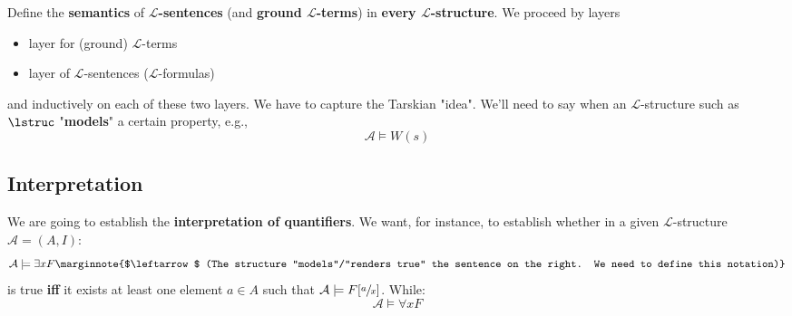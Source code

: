 \noindent
Define the \textbf{semantics} of \textbf{$\mathcal{L}$-sentences} (and \textbf{ground $\mathcal{L}$-terms}) in \textbf{every $\mathcal{L}$-structure}. We proceed by layers
\begin{itemize}
	\item layer for (ground) $\mathcal{L}$-terms
	\item layer of $\mathcal{L}$-sentences ($\mathcal{L}$-formulas)
\end{itemize}
and inductively on each of these two layers. We have to capture the Tarskian "idea". We'll need to say when an $\mathcal{L}$-structure such as $\lstruc$ "\textbf{models}" a certain property, e.g.,
$$ \mathcal{A} \models W(s)$$






\subsection{Interpretation}

We are going to establish the \textbf{interpretation of quantifiers}. We want, for instance, to establish whether in a given $\mathcal{L}$-structure $\mathcal{A} = (A,I)$:
$$ \mathcal{A} \models \exists x F \marginnote{$\leftarrow$ (The structure "models"/"renders true" the sentence on the right. We need to define this notation)}$$
\noindent
is true \textbf{iff} it exists at least one element $a \in A$ such that $\mathcal{A} \models F[\sfrac{a}{x}]$. While:
$$ \mathcal{A} \models \forall x F $$

